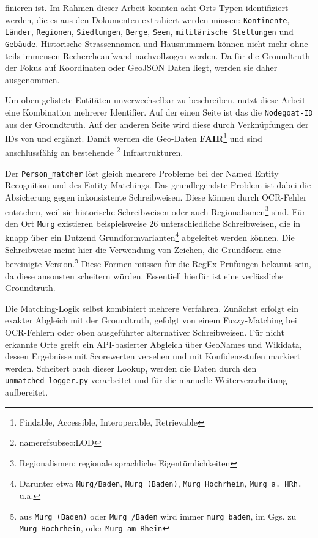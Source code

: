 \documentclass[12pt, a4paper, ngerman, bidi=default]{article}
\newcommand{\code}[1]{\colorbox{VeryLightGray}{\texttt{#1}}} %
\begin{document}
finieren ist. Im Rahmen dieser Arbeit konnten acht Orts-Typen identifiziert werden, die es aus den Dokumenten extrahiert werden müssen:
\code{Kontinente},
\code{Länder},
\code{Regionen},
\code{Siedlungen},
\code{Berge},
\code{Seen},
\code{militärische Stellungen} und
\code{Gebäude}.
Historische Strassennamen und Hausnummern können nicht mehr ohne teils immensen Rechercheaufwand nachvollzogen werden. Da für die Groundtruth der Fokus auf Koordinaten oder GeoJSON Daten liegt, werden sie daher ausgenommen.

Um oben gelistete Entitäten unverwechselbar zu beschreiben, nutzt diese Arbeit eine Kombination mehrerer Identifier. Auf der einen Seite ist das die \code{Nodegoat-ID} aus der Groundtruth. Auf der anderen Seite wird diese durch Verknüpfungen der IDs von  und  ergänzt. Damit werden die Geo-Daten \textbf{FAIR}\footnote{Findable, Accessible, Interoperable, Retrievable} und sind anschlussfähig an bestehende \footnote{nameref{subsec:LOD}} Infrastrukturen. 

Der \code{Person\_matcher} löst gleich mehrere Probleme bei der Named Entity Recognition und des Entity Matchings. Das grundlegendste Problem ist dabei die Absicherung gegen inkonsistente Schreibweisen. Diese können durch OCR-Fehler entstehen, weil sie historische Schreibweisen oder auch Regionalismen\footnote{Regionalismen: regionale sprachliche Eigentümlichkeiten} sind. Für den Ort \texttt{Murg} existieren beispielsweise 26 unterschiedliche Schreibweisen, die in knapp über ein Dutzend Grundformvarianten\footnote{Darunter etwa \texttt{Murg/Baden}, \texttt{Murg (Baden)}, \texttt{Murg Hochrhein}, \texttt{Murg a.\ HRh.} u.a.} abgeleitet werden können. Die Schreibweise meint hier die Verwendung von Zeichen, die Grundform eine bereinigte Version.\footnote{aus \texttt{Murg (Baden)} oder \texttt{Murg /Baden} wird immer \texttt{murg baden}, im Ggs. zu \texttt{Murg Hochrhein}, oder \texttt{Murg am Rhein}} Diese Formen müssen für die RegEx-Prüfungen bekannt sein, da diese ansonsten scheitern würden. Essentiell hierfür ist eine verlässliche Groundtruth.

Die Matching-Logik selbst kombiniert mehrere Verfahren. Zunächst erfolgt ein exakter Abgleich mit der Groundtruth, gefolgt von einem Fuzzy-Matching bei OCR-Fehlern oder oben ausgeführter alternativer Schreibweisen. Für nicht erkannte Orte greift ein API-basierter Abgleich über GeoNames und Wikidata, dessen Ergebnisse mit Scorewerten versehen und mit Konfidenzstufen markiert werden. Scheitert auch dieser Lookup, werden die Daten durch den \code{unmatched\_logger.py} verarbeitet und für die manuelle Weiterverarbeitung aufbereitet. 
\end{document}
